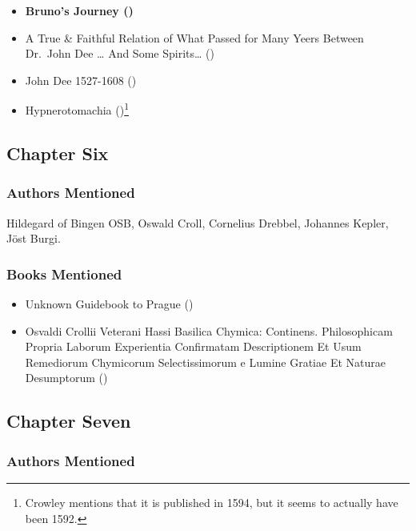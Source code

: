 \documentclass[
]{article}
\providecommand{\tightlist}{%
  \setlength{\itemsep}{0pt}\setlength{\parskip}{0pt}}
\begin{document}
\begin{itemize}
\tightlist
\item
  \textbf{Bruno's Journey ()}
\item
  A True \& Faithful Relation of What Passed for Many Yeers Between
  Dr.~John Dee \ldots{} And Some Spirits\ldots{}
  ()
\item
  John Dee 1527-1608 ()
\item
  Hypnerotomachia ()\footnote{Crowley
    mentions that it is published in 1594, but it seems to actually have
    been 1592.}
\end{itemize}

\subsection{Chapter Six}\label{chapter-six-1}

\subsubsection{Authors Mentioned}\label{authors-mentioned-10}

Hildegard of Bingen OSB, Oswald Croll, Cornelius Drebbel, Johannes
Kepler, Jöst Burgi.

\subsubsection{Books Mentioned}\label{books-mentioned-11}

\begin{itemize}
\tightlist
\item
  Unknown Guidebook to Prague ()
\item
  Osvaldi Crollii Veterani Hassi Basilica Chymica: Continens.
  Philosophicam Propria Laborum Experientia Confirmatam Descriptionem Et
  Usum Remediorum Chymicorum Selectissimorum e Lumine Gratiae Et Naturae
  Desumptorum ()
\end{itemize}

\subsection{Chapter Seven}\label{chapter-seven}

\subsubsection{Authors Mentioned}\label{authors-mentioned-11}
\end{document}
